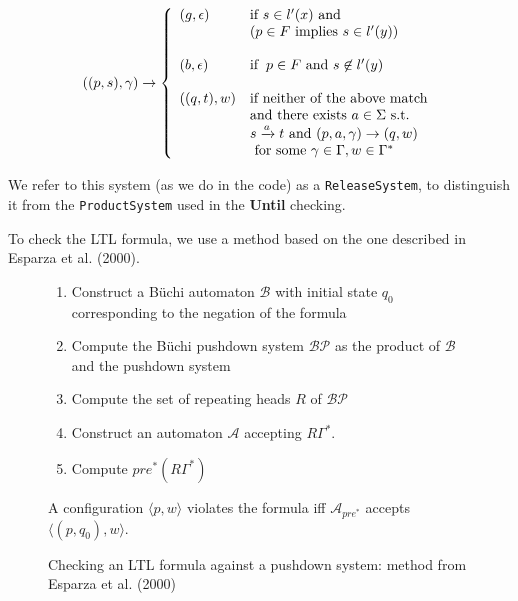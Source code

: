 \documentclass[11pt]{article}
\theoremstyle{definition}
\begin{document}
\begin{displaymath}
   ((p,s),\gamma) \rightarrow \left\{
     \begin{array}{ll}
       (g, \epsilon) & \text{if } s \in l'(x) \text{ and} \\
                     & (p \in F \text{ implies } s \in l'(y)) \\
       & \\
       (b, \epsilon) & \text{if}  \hspace{2mm} p \in F \text{ and } s \not \in l'(y) \\
       & \\
       ((q,t),w)     & \text{if neither of the above match} \\
                     & \text{and there exists } a \in \Sigma \text{ s.t. } \\
                     & s \xrightarrow{a} t \text{ and } (p, a, \gamma) \rightarrow (q, w) \\
                     & \text{ for some } \gamma \in \Gamma, w \in \Gamma^*
     \end{array}
   \right.
\end{displaymath}

We refer to this system (as we do in the code) as a \texttt{ReleaseSystem}, to
distinguish it from the \texttt{ProductSystem} used in the \textbf{Until}
checking.

To check the LTL formula, we use a method based on the one described in Esparza et al. (2000)\cite{EHRS00b}.

\begin{figure}[h!]
\caption{Checking an LTL formula against a pushdown system: method from Esparza et al. (2000)\cite{EHRS00b} }
\begin{enumerate}
\item{Construct a B\"{u}chi automaton $\mathcal{B}$ with initial state $q_0$ corresponding to the negation of the formula}
\item{Compute the B\"{u}chi pushdown system $\mathcal{BP}$ as the product of $\mathcal{B}$ and the pushdown system}
\item{Compute the set of repeating heads $R$ of $\mathcal{BP}$}
\item{Construct an automaton $\mathcal{A}$ accepting $R\Gamma^*$.}
\item{Compute $pre^*(R\Gamma^*)$}
\end{enumerate}
A configuration $\langle p, w \rangle$ violates the formula iff $\mathcal{A}_{pre^*}$ accepts $\langle (p, q_0 ), w\rangle$.

\end{figure}
\end{document}
